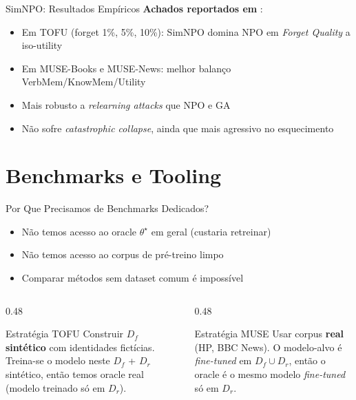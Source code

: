 \documentclass[aspectratio=169,xcolor=dvipsnames]{beamer}
\begin{document}
  \begin{frame}{SimNPO: Resultados Empíricos}
    \textbf{Achados reportados em }:
    \begin{itemize}\setlength{\itemsep}{0.2em}
      \item Em TOFU (forget 1\%, 5\%, 10\%): SimNPO domina NPO em \textit{Forget Quality} a iso-utility
      \item Em MUSE-Books e MUSE-News: melhor balanço VerbMem/KnowMem/Utility
      \item Mais robusto a \textit{relearning attacks} que NPO e GA
      \item Não sofre \textit{catastrophic collapse}, ainda que mais agressivo no esquecimento
    \end{itemize}

  \end{frame}

  \section{Benchmarks e Tooling}

  \begin{frame}{Por Que Precisamos de Benchmarks Dedicados?}
    \begin{itemize}\setlength{\itemsep}{0.2em}
      \item Não temos acesso ao oracle $\theta^\star$ em geral (custaria retreinar)
      \item Não temos acesso ao corpus de pré-treino limpo
      \item Comparar métodos sem dataset comum é impossível
    \end{itemize}

    \vspace{0.4em}
    \begin{columns}[T]
      \begin{column}{0.48\textwidth}
        \begin{block}{Estratégia TOFU}
          Construir $D_f$ \textbf{sintético} com identidades fictícias. Treina-se o modelo neste $D_f$ + $D_r$ sintético, então temos oracle real (modelo treinado só em $D_r$).
        \end{block}
      \end{column}
      \begin{column}{0.48\textwidth}
        \begin{block}{Estratégia MUSE}
          Usar corpus \textbf{real} (HP, BBC News). O modelo-alvo é \textit{fine-tuned} em $D_f \cup D_r$, então o oracle é o mesmo modelo \textit{fine-tuned} só em $D_r$.
        \end{block}
      \end{column}
    \end{columns}
  \end{frame}
\end{document}
